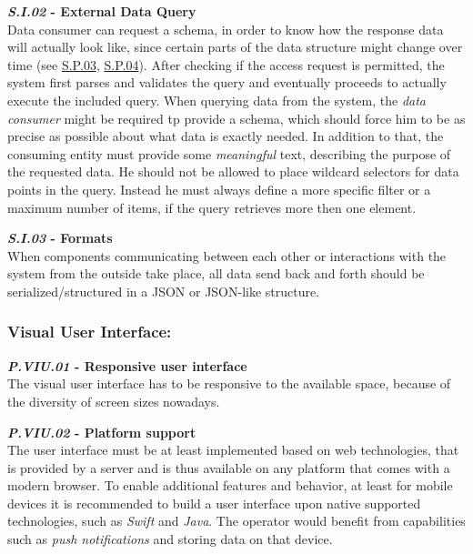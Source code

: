 \documentclass[12pt,english,a4paper,titlepage,cleardoublepage=empty,dottedtoc]{report}
\begin{document}
\textbf{\emph{\protect\hypertarget{si02}{}{S.I.02}} - External Data
Query}\\
Data consumer can request a schema, in order to know how the response
data will actually look like, since certain parts of the data structure
might change over time (see \protect\hyperlink{sp03}{S.P.03},
\protect\hyperlink{sp04}{S.P.04}). After checking if the access request
is permitted, the system first parses and validates the query and
eventually proceeds to actually execute the included query. When
querying data from the system, the \emph{data consumer} might be
required tp provide a schema, which should force him to be as precise as
possible about what data is exactly needed. In addition to that, the
consuming entity must provide some \emph{meaningful} text, describing
the purpose of the requested data. He should not be allowed to place
wildcard selectors for data points in the query. Instead he must always
define a more specific filter or a maximum number of items, if the query
retrieves more then one element.

\textbf{\emph{\protect\hypertarget{si03}{}{S.I.03}} - Formats}\\
When components communicating between each other or interactions with
the system from the outside take place, all data send back and forth
should be serialized/structured in a JSON or JSON-like structure.

\subsubsection{Visual User Interface:}\label{visual-user-interface}

\textbf{\emph{\protect\hypertarget{pviu01}{}{P.VIU.01}} - Responsive
user interface}\\
The visual user interface has to be responsive to the available space,
because of the diversity of screen sizes nowadays.

\textbf{\emph{\protect\hypertarget{pviu02}{}{P.VIU.02}} - Platform
support}\\
The user interface must be at least implemented based on web
technologies, that is provided by a server and is thus available on any
platform that comes with a modern browser. To enable additional features
and behavior, at least for mobile devices it is recommended to build a
user interface upon native supported technologies, such as \emph{Swift}
and \emph{Java}. The operator would benefit from capabilities such as
\emph{push notifications} and storing data on that device.
\end{document}
